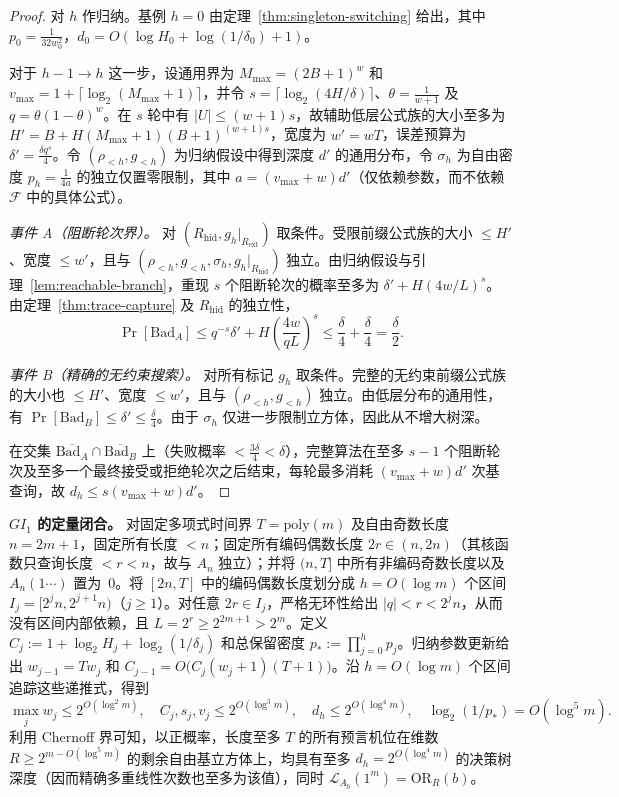 \documentclass[11pt,a4paper]{article}
\theoremstyle{definition}
\theoremstyle{remark}
\newcommand{\OR}{\mathrm{OR}}
\newcommand{\Prb}{\Pr}
\newcommand{\GI}{GI_1}
\begin{document}
\begin{proof}
对 $h$ 作归纳。基例 $h=0$ 由定理~\ref{thm:singleton-switching} 给出，其中 $p_0=\frac1{32w_0^2}$，$d_0=O(\log H_0+\log(1/\delta_0)+1)$。

对于 $h-1\to h$ 这一步，设通用界为 $M_{\max}=(2B+1)^w$ 和 $v_{\max}=1+\lceil\log_2(M_{\max}+1)\rceil$，并令 $s=\lceil\log_2(4H/\delta)\rceil$、$\theta=\frac1{w+1}$ 及 $q=\theta(1-\theta)^w$。在 $s$ 轮中有 $|U|\le(w+1)s$，故辅助低层公式族的大小至多为 $H'=B+H(M_{\max}+1)(B+1)^{(w+1)s}$，宽度为 $w'=wT$，误差预算为 $\delta'=\frac{\delta q^s}4$。令 $(\rho_{<h},g_{<h})$ 为归纳假设中得到深度 $d'$ 的通用分布，令 $\sigma_h$ 为自由密度 $p_h=\frac1{4a}$ 的独立仅置零限制，其中 $a=(v_{\max}+w)d'$（仅依赖参数，而不依赖 $\mathcal F$ 中的具体公式）。

\emph{事件 A（阻断轮次界）。} 对 $(R_{\mathrm{hid}},g_h|_{R_{\mathrm{ext}}})$ 取条件。受限前缀公式族的大小 $\le H'$、宽度 $\le w'$，且与 $(\rho_{<h},g_{<h},\sigma_h,g_h|_{R_{\mathrm{hid}}})$ 独立。由归纳假设与引理~\ref{lem:reachable-branch}，重现 $s$ 个阻断轮次的概率至多为 $\delta'+H(4w/L)^s$。由定理~\ref{thm:trace-capture} 及 $R_{\mathrm{hid}}$ 的独立性，
\[
  \Prb[\mathrm{Bad}_A] \le q^{-s}\delta' + H\left(\frac{4w}{qL}\right)^s \le \frac{\delta}{4} + \frac{\delta}{4} = \frac{\delta}{2}.
\]

\emph{事件 B（精确的无约束搜索）。} 对所有标记 $g_h$ 取条件。完整的无约束前缀公式族的大小也 $\le H'$、宽度 $\le w'$，且与 $(\rho_{<h},g_{<h})$ 独立。由低层分布的通用性，有 $\Prb[\mathrm{Bad}_B]\le\delta'\le\frac\delta4$。由于 $\sigma_h$ 仅进一步限制立方体，因此从不增大树深。

在交集 $\overline{\mathrm{Bad}_A}\cap\overline{\mathrm{Bad}_B}$ 上（失败概率 $<\frac{3\delta}4<\delta$），完整算法在至多 $s-1$ 个阻断轮次及至多一个最终接受或拒绝轮次之后结束，每轮最多消耗 $(v_{\max}+w)d'$ 次基查询，故 $d_h\le s(v_{\max}+w)d'$。
\end{proof}

\textbf{$\GI$ 的定量闭合。} 对固定多项式时间界 $T=\mathrm{poly}(m)$ 及自由奇数长度 $n=2m+1$，固定所有长度 $<n$；固定所有编码偶数长度 $2r\in(n,2n)$（其核函数只查询长度 $<r<n$，故与 $A_n$ 独立）；并将 $(n,T]$ 中所有非编码奇数长度以及 $A_n(1\cdots)$ 置为~$0$。将 $[2n,T]$ 中的编码偶数长度划分成 $h=O(\log m)$ 个区间 $I_j=[2^jn,2^{j+1}n)$（$j\ge1$）。对任意 $2r\in I_j$，严格无环性给出 $|q|<r<2^jn$，从而没有区间内部依赖，且 $L=2^r\ge2^{2m+1}>2^m$。定义 $C_j:=1+\log_2 H_j+\log_2(1/\delta_j)$ 和总保留密度 $p_*:=\prod_{j=0}^h p_j$。归纳参数更新给出 $w_{j-1}=Tw_j$ 和 $C_{j-1}=O\bigl(C_j(w_j+1)(T+1)\bigr)$。沿 $h=O(\log m)$ 个区间追踪这些递推式，得到
\[
  \max_j w_j \le 2^{O(\log^2 m)},\quad
  C_j, s_j, v_j \le 2^{O(\log^3 m)},\quad
  d_h \le 2^{O(\log^4 m)},\quad
  \log_2(1/p_*) = O(\log^5 m).
\]
利用 Chernoff 界可知，以正概率，长度至多 $T$ 的所有预言机位在维数 $R\ge2^{m-O(\log^5m)}$ 的剩余自由基立方体上，均具有至多 $d_h=2^{O(\log^4m)}$ 的决策树深度（因而精确多重线性次数也至多为该值），同时 $\mathcal L_{A_b}(1^m)=\OR_R(b)$。
\end{document}
